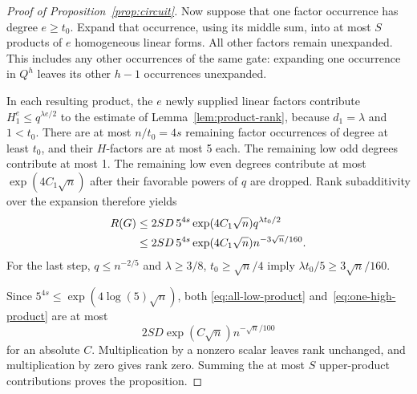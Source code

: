 \begin{proof}[Proof of Proposition~\ref{prop:circuit}]
Now suppose that one factor occurrence has degree $e\ge t_0$.
Expand that occurrence, using its middle sum, into at most $S$
products of $e$ homogeneous linear forms.  All other factors remain
unexpanded.  This includes any other occurrences of the same gate:
expanding one occurrence in $Q^h$ leaves its other $h-1$ occurrences
unexpanded.

In each resulting product, the $e$ newly supplied linear factors
contribute $H_1^e\le q^{\lambda e/2}$ to the estimate of
Lemma~\ref{lem:product-rank}, because $d_1=\lambda$ and $1<t_0$.
There are at most $n/t_0=4s$ remaining factor occurrences of degree
at least $t_0$, and their $H$-factors are at most 5 each.  The
remaining low odd degrees contribute at most 1.  The remaining low
even degrees contribute at most $\exp(4C_1\sqrt n)$ after their
favorable powers of $q$ are dropped.  Rank subadditivity over the
expansion therefore yields
\begin{align}
\label{eq:one-high-product}
 R(G)
 &\le2SD\,5^{4s}\exp(4C_1\sqrt n)q^{\lambda t_0/2}\notag\\
 &\le2SD\,5^{4s}\exp(4C_1\sqrt n)n^{-3\sqrt n/160}.
\end{align}
For the last step, $q\le n^{-2/5}$ and
$\lambda\ge3/8$, $t_0\ge\sqrt n/4$ imply
$\lambda t_0/5\ge3\sqrt n/160$.

Since $5^{4s}\le\exp(4\log(5)\sqrt n)$, both
\eqref{eq:all-low-product} and~\eqref{eq:one-high-product} are at most
\[
 2SD\exp(C\sqrt n)n^{-\sqrt n/100}
\]
for an absolute $C$.  Multiplication by a nonzero scalar leaves rank
unchanged, and multiplication by zero gives rank zero.  Summing the
at most $S$ upper-product contributions proves the proposition.
\end{proof}
